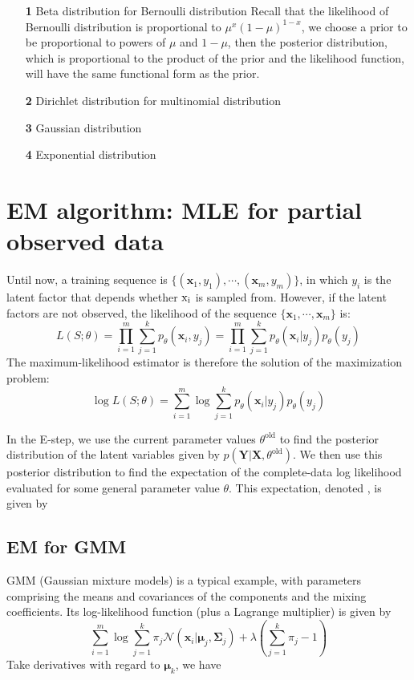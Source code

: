 \documentclass{article}
\begin{document}
	\begin{itemize}
	\item [\textbf{1}] Beta distribution for Bernoulli distribution
	Recall that the likelihood of Bernoulli distribution is proportional to $\mu^x (1-\mu)^{1-x}$,	we choose a prior to be proportional to powers of $\mu$ and $1-\mu$, then the posterior distribution, which is proportional to the product of the
prior and the likelihood function, will have the same functional form as the prior.
	\item [\textbf{2}] Dirichlet distribution for multinomial distribution
	\item [\textbf{3}] Gaussian distribution
	\item [\textbf{4}] Exponential distribution
	\end{itemize}
	
\section{EM algorithm: MLE for partial observed data}
	Until now, a training sequence is $\{(\bm{x}_1,y_1),\cdots,(\bm{x}_m,y_m)\}$, in which $y_i$ is the latent factor that depends whether $\rm{x}_i$ is sampled from. However, if the latent factors are not observed, the likelihood of the sequence $\{\bm{x}_1,\cdots,\bm{x}_m\}$ is:
	\begin{equation*}
	L(S;\theta) = \prod_{i=1}^m \sum_{j=1}^k p_\theta(\bm{x}_i,y_j) = \prod_{i=1}^m \sum_{j=1}^k p_\theta(\bm{x}_i|y_j)p_\theta(y_j)
	\end{equation*}
	The maximum-likelihood estimator is therefore the solution of the maximization problem:
	\begin{equation}
	\log L(S;\theta) = \sum_{i=1}^m \log \sum_{j=1}^k p_\theta(\bm{x}_i|y_j)p_\theta(y_j)
	\end{equation}
	
	In the E-step, we use the current parameter values $\theta^{\mathrm{old}}$ to find the posterior distribution of the latent variables given by $p(\bm{Y}|\bm{X}, \theta^{\mathrm{old}})$. We then use this posterior distribution to find the expectation of the complete-data log likelihood evaluated for some general parameter value $\theta$. This expectation, denoted , is given by
	
	\subsection{EM for GMM}
	
	GMM (Gaussian mixture models) is a typical example, with parameters comprising the means and covariances of the components and the mixing coefficients. Its log-likelihood function (plus a Lagrange multiplier) is given by
	\begin{equation*}
	\sum_{i=1}^m \log \sum_{j=1}^k \pi_j \mathcal{N} (\bm{x}_i|\bm{\mu}_j,\bm{\Sigma}_j) + \lambda \left(\sum_{j=1}^k \pi_j - 1\right)
	\end{equation*}
	Take derivatives with regard to $\bm{\mu}_k$, we have
	
\end{document}
